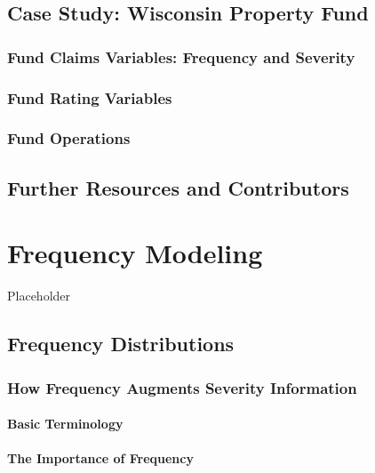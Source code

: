 \documentclass[]{book}
\theoremstyle{definition}
\theoremstyle{definition}
\theoremstyle{definition}
\theoremstyle{remark}
\begin{document}
\section{Case Study: Wisconsin Property Fund}\label{S:LGPIF}

\subsection{Fund Claims Variables: Frequency and
Severity}\label{S:OutComes}

\subsection{Fund Rating Variables}\label{S:FundVariables}

\subsection{Fund Operations}\label{fund-operations}

\section{Further Resources and
Contributors}\label{Intro-further-reading-and-resources}

\chapter{Frequency Modeling}\label{C:Frequency-Modeling}

Placeholder

\section{Frequency Distributions}\label{S:frequency-distributions}

\subsection{How Frequency Augments Severity
Information}\label{S:how-frequency-augments-severity-information}

\subsubsection{Basic Terminology}\label{S:basic-terminology}

\subsubsection{The Importance of
Frequency}\label{S:the-importance-of-frequency}
\end{document}
